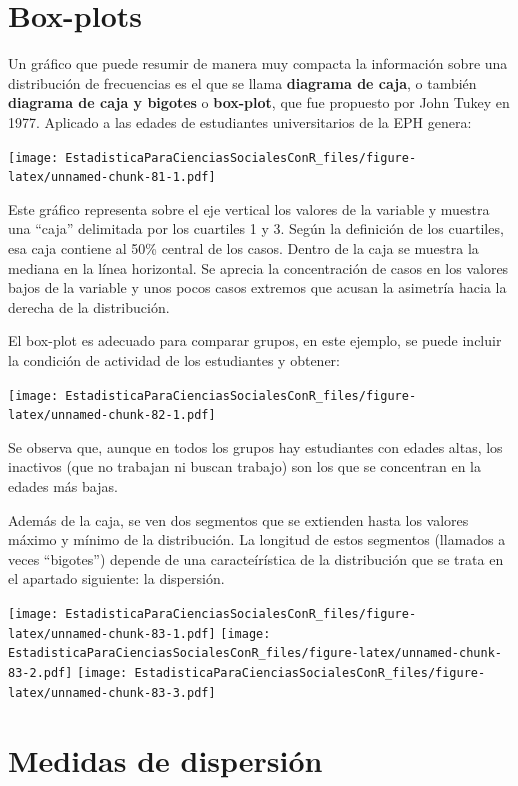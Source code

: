 \documentclass[]{book}
\begin{document}
\hypertarget{box-plots}{%
\section{Box-plots}\label{box-plots}}

Un gráfico que puede resumir de manera muy compacta la información sobre
una distribución de frecuencias es el que se llama \textbf{diagrama de caja},
o también \textbf{diagrama de caja y bigotes} o \textbf{box-plot}, que fue
propuesto por John Tukey en 1977.
Aplicado a las edades de estudiantes universitarios de la EPH genera:

\texttt{[image: EstadisticaParaCienciasSocialesConR\_files/figure-latex/unnamed-chunk-81-1.pdf]}

Este gráfico representa sobre el eje vertical los valores de la variable y muestra una ``caja'' delimitada por los cuartiles 1 y 3. Según la definición de los cuartiles, esa caja contiene al 50\% central de los casos. Dentro de la caja se muestra la mediana en la línea horizontal. Se aprecia la concentración de casos en los valores bajos de la variable y unos pocos casos extremos que acusan la asimetría hacia la derecha de la distribución.

El box-plot es adecuado para comparar grupos, en este ejemplo, se puede incluir la condición de actividad de los estudiantes y obtener:

\texttt{[image: EstadisticaParaCienciasSocialesConR\_files/figure-latex/unnamed-chunk-82-1.pdf]}

Se observa que, aunque en todos los grupos hay estudiantes con edades altas, los inactivos (que no trabajan ni buscan trabajo) son los que se concentran en la edades más bajas.

Además de la caja, se ven dos segmentos que se extienden hasta los
valores máximo y mínimo de la distribución. La longitud de estos segmentos (llamados a veces ``bigotes'') depende de una caracteírística de la distribución que se trata en el apartado siguiente: la
dispersión.

\texttt{[image: EstadisticaParaCienciasSocialesConR\_files/figure-latex/unnamed-chunk-83-1.pdf]} \texttt{[image: EstadisticaParaCienciasSocialesConR\_files/figure-latex/unnamed-chunk-83-2.pdf]} \texttt{[image: EstadisticaParaCienciasSocialesConR\_files/figure-latex/unnamed-chunk-83-3.pdf]}

\hypertarget{medidas-de-dispersiuxf3n}{%
\section{Medidas de dispersión}\label{medidas-de-dispersiuxf3n}}
\end{document}
